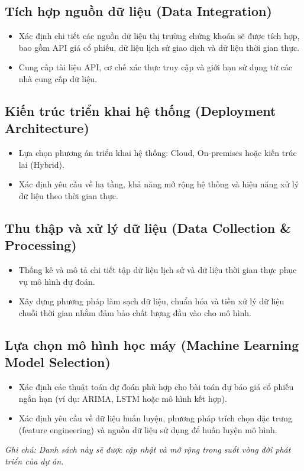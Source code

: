 \documentclass[12pt, a4paper]{article}
\begin{document}
\subsection{Tích hợp nguồn dữ liệu (Data Integration)}
\begin{itemize}
    \item Xác định chi tiết các nguồn dữ liệu thị trường chứng khoán sẽ được tích hợp, bao gồm API giá cổ phiếu, dữ liệu lịch sử giao dịch và dữ liệu thời gian thực.
    \item Cung cấp tài liệu API, cơ chế xác thực truy cập và giới hạn sử dụng từ các nhà cung cấp dữ liệu.
\end{itemize}

\subsection{Kiến trúc triển khai hệ thống (Deployment Architecture)}
\begin{itemize}
    \item Lựa chọn phương án triển khai hệ thống: Cloud, On-premises hoặc kiến trúc lai (Hybrid).
    \item Xác định yêu cầu về hạ tầng, khả năng mở rộng hệ thống và hiệu năng xử lý dữ liệu theo thời gian thực.
\end{itemize}

\subsection{Thu thập và xử lý dữ liệu (Data Collection \& Processing)}
\begin{itemize}
    \item Thống kê và mô tả chi tiết tập dữ liệu lịch sử và dữ liệu thời gian thực phục vụ mô hình dự đoán.
    \item Xây dựng phương pháp làm sạch dữ liệu, chuẩn hóa và tiền xử lý dữ liệu chuỗi thời gian nhằm đảm bảo chất lượng đầu vào cho mô hình.
\end{itemize}

\subsection{Lựa chọn mô hình học máy (Machine Learning Model Selection)}
\begin{itemize}
    \item Xác định các thuật toán dự đoán phù hợp cho bài toán dự báo giá cổ phiếu ngắn hạn (ví dụ: ARIMA, LSTM hoặc mô hình kết hợp).
    \item Xác định yêu cầu về dữ liệu huấn luyện, phương pháp trích chọn đặc trưng (feature engineering) và nguồn dữ liệu sử dụng để huấn luyện mô hình.
\end{itemize}

\vspace{0.5cm}
\noindent\textit{Ghi chú: Danh sách này sẽ được cập nhật và mở rộng trong suốt vòng đời phát triển của dự án.}
\end{document}

